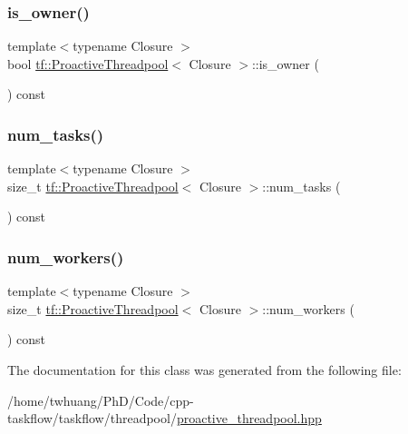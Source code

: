 \subsubsection{\texorpdfstring{is\+\_\+owner()}{is\_owner()}}
{\footnotesize\ttfamily template$<$typename Closure $>$ \\
bool \hyperlink{classtf_1_1ProactiveThreadpool}{tf\+::\+Proactive\+Threadpool}$<$ Closure $>$\+::is\+\_\+owner (\begin{DoxyParamCaption}{ }\end{DoxyParamCaption}) const}

\mbox{\label{classtf_1_1ProactiveThreadpool_a4ffa8ab018d0bb63fbee5ae16035bb15}} 
\subsubsection{\texorpdfstring{num\+\_\+tasks()}{num\_tasks()}}
{\footnotesize\ttfamily template$<$typename Closure $>$ \\
size\+\_\+t \hyperlink{classtf_1_1ProactiveThreadpool}{tf\+::\+Proactive\+Threadpool}$<$ Closure $>$\+::num\+\_\+tasks (\begin{DoxyParamCaption}{ }\end{DoxyParamCaption}) const}

\mbox{\label{classtf_1_1ProactiveThreadpool_addcc49e4a76ced0b0d0a3d7e00796d42}} 
\subsubsection{\texorpdfstring{num\+\_\+workers()}{num\_workers()}}
{\footnotesize\ttfamily template$<$typename Closure $>$ \\
size\+\_\+t \hyperlink{classtf_1_1ProactiveThreadpool}{tf\+::\+Proactive\+Threadpool}$<$ Closure $>$\+::num\+\_\+workers (\begin{DoxyParamCaption}{ }\end{DoxyParamCaption}) const}



The documentation for this class was generated from the following file\+:\begin{DoxyCompactItemize}
\item 
/home/twhuang/\+Ph\+D/\+Code/cpp-\/taskflow/taskflow/threadpool/\hyperlink{proactive__threadpool_8hpp}{proactive\+\_\+threadpool.\+hpp}\end{DoxyCompactItemize}
